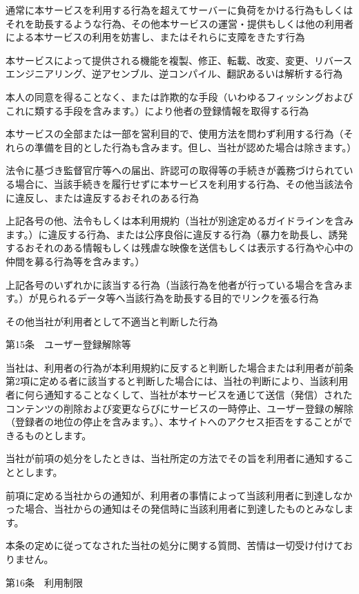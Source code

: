         通常に本サービスを利用する行為を超えてサーバーに負荷をかける行為もしくはそれを助長するような行為、その他本サービスの運営・提供もしくは他の利用者による本サービスの利用を妨害し、またはそれらに支障をきたす行為

        本サービスによって提供される機能を複製、修正、転載、改変、変更、リバースエンジニアリング、逆アセンブル、逆コンパイル、翻訳あるいは解析する行為

        本人の同意を得ることなく、または詐欺的な手段（いわゆるフィッシングおよびこれに類する手段を含みます。）により他者の登録情報を取得する行為

        本サービスの全部または一部を営利目的で、使用方法を問わず利用する行為（それらの準備を目的とした行為も含みます。但し、当社が認めた場合は除きます。）

        法令に基づき監督官庁等への届出、許認可の取得等の手続きが義務づけられている場合に、当該手続きを履行せずに本サービスを利用する行為、その他当該法令に違反し、または違反するおそれのある行為

        上記各号の他、法令もしくは本利用規約（当社が別途定めるガイドラインを含みます。）に違反する行為、または公序良俗に違反する行為（暴力を助長し、誘発するおそれのある情報もしくは残虐な映像を送信もしくは表示する行為や心中の仲間を募る行為等を含みます。）

        上記各号のいずれかに該当する行為（当該行為を他者が行っている場合を含みます。）が見られるデータ等へ当該行為を助長する目的でリンクを張る行為

        その他当社が利用者として不適当と判断した行為

第15条　ユーザー登録解除等

    当社は、利用者の行為が本利用規約に反すると判断した場合または利用者が前条第2項に定める者に該当すると判断した場合には、当社の判断により、当該利用者に何ら通知することなくして、当社が本サービスを通じて送信（発信）されたコンテンツの削除および変更ならびにサービスの一時停止、ユーザー登録の解除（登録者の地位の停止を含みます。）、本サイトへのアクセス拒否をすることができるものとします。

    当社が前項の処分をしたときは、当社所定の方法でその旨を利用者に通知することとします。

    前項に定める当社からの通知が、利用者の事情によって当該利用者に到達しなかった場合、当社からの通知はその発信時に当該利用者に到達したものとみなします。

    本条の定めに従ってなされた当社の処分に関する質問、苦情は一切受け付けておりません。

第16条　利用制限

